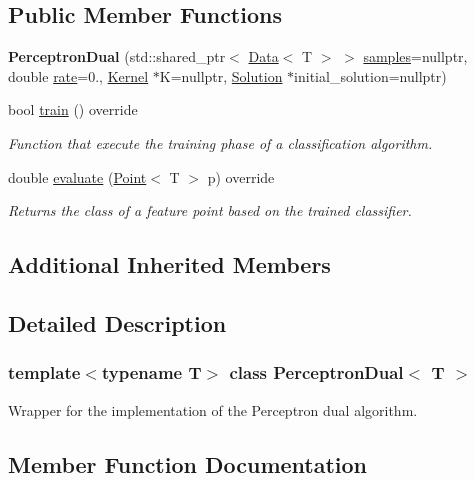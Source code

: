 \subsection*{Public Member Functions}
\begin{DoxyCompactItemize}
\item 
\mbox{\label{class_perceptron_dual_a09289b10cd42be37fe50a7733f2a83e4}} 
{\bfseries Perceptron\+Dual} (std\+::shared\+\_\+ptr$<$ \hyperlink{class_data}{Data}$<$ T $>$ $>$ \hyperlink{class_classifier_a0000b47a2e0784ada4c52d7046c4adb8}{samples}=nullptr, double \hyperlink{class_classifier_a7b1c4ef87631bd9e46682e5bc4315111}{rate}=0., \hyperlink{class_kernel}{Kernel} $\ast$K=nullptr, \hyperlink{class_solution}{Solution} $\ast$initial\+\_\+solution=nullptr)
\item 
bool \hyperlink{class_perceptron_dual_ac5e6aac8184fdf8f9d39d8d183d49190}{train} () override
\begin{DoxyCompactList}\small\item\em Function that execute the training phase of a classification algorithm. \end{DoxyCompactList}\item 
double \hyperlink{class_perceptron_dual_afae65908732e5f011be1d384387c71fe}{evaluate} (\hyperlink{class_point}{Point}$<$ T $>$ p) override
\begin{DoxyCompactList}\small\item\em Returns the class of a feature point based on the trained classifier. \end{DoxyCompactList}\end{DoxyCompactItemize}
\subsection*{Additional Inherited Members}


\subsection{Detailed Description}
\subsubsection*{template$<$typename T$>$\newline
class Perceptron\+Dual$<$ T $>$}

Wrapper for the implementation of the Perceptron dual algorithm. 

\subsection{Member Function Documentation}
\mbox{\label{class_perceptron_dual_afae65908732e5f011be1d384387c71fe}} 

